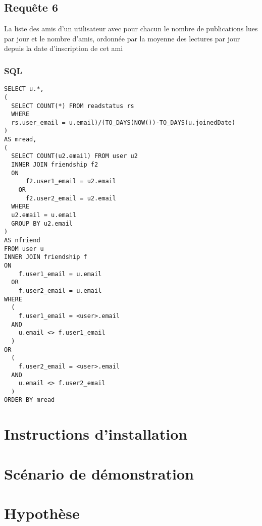 \documentclass[a4paper,10pt]{article}
\begin{document}
\subsection{Requête 6}
La liste des amis d’un utilisateur avec pour chacun le nombre de publications lues par jour et le nombre
d’amis, ordonnée par la moyenne des lectures par jour depuis la date d’inscription de cet ami

\subsubsection{SQL}
\begin{lstlisting}
SELECT u.*,
(
  SELECT COUNT(*) FROM readstatus rs 
  WHERE 
  rs.user_email = u.email)/(TO_DAYS(NOW())-TO_DAYS(u.joinedDate)
) 
AS mread,
(
  SELECT COUNT(u2.email) FROM user u2
  INNER JOIN friendship f2 
  ON 
      f2.user1_email = u2.email 
    OR 
      f2.user2_email = u2.email
  WHERE 
  u2.email = u.email 
  GROUP BY u2.email
) 
AS nfriend
FROM user u
INNER JOIN friendship f 
ON 
    f.user1_email = u.email 
  OR 
    f.user2_email = u.email
WHERE 
  (
    f.user1_email = <user>.email 
  AND 
    u.email <> f.user1_email
  ) 
OR 
  (
    f.user2_email = <user>.email 
  AND 
    u.email <> f.user2_email
  )
ORDER BY mread
\end{lstlisting}
		
\section{Instructions d'installation}
		
\section{Scénario de démonstration}
		
\section{Hypothèse}
\end{document}
